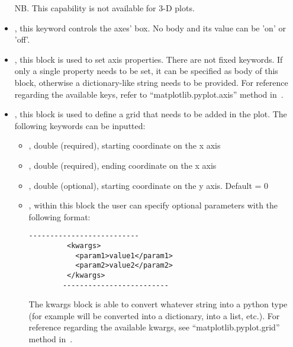 \begin{itemize}
\begin{itemize}
      \end{itemize}
  NB.
  This capability is not available for 3-D plots.
  \item {}, this keyword controls the axes' box.
  No body and its value can be 'on' or 'off'.
  \item {}, this block is used to set axis properties.
  There are not fixed keywords.
  If only a single property needs to be set, it can be specified as body of this
  block, otherwise a dictionary-like string needs to be provided.
  For reference regarding the available keys, refer to
  ``matplotlib.pyplot.axis'' method in~\cite{MatPlotLib}.
  \item {}, this block is used to define a grid that needs to be added in
  the plot.
  The following keywords can be inputted:
    \begin{itemize}
    \item \textit{}, double (required), starting coordinate on the x axis
    \item \textit{}, double (required), ending coordinate on the x axis
    \item \textit{}, double (optional), starting coordinate on the y
    axis.
    Default = 0
    \item \textit{}, within this block the user can specify optional
    parameters with the following format:
        \begin{lstlisting}[style=XML]
        --------------------------
         <kwargs>
           <param1>value1</param1>
           <param2>value2</param2>
         </kwargs>
        -------------------------
       \end{lstlisting}
    The kwargs block is able to convert whatever string into a python type (for
    example  will be converted into a
    dictionary,  into a list, etc.).
    For reference regarding the available kwargs, see ``matplotlib.pyplot.grid''
    method in~\cite{MatPlotLib}.
      \end{itemize}
  \vspace{-5mm}
\end{itemize}
